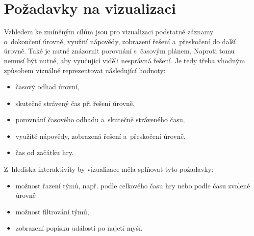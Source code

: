 \documentclass[
  digital, %
  oneside, %
  table,   %
  nolof,     %
  nolot,     %
]{fithesis3}
\begin{document}
\section{Požadavky na vizualizaci}
Vzhledem ke zmíněným cílům jsou pro vizualizaci podstatné záznamy o~dokončení úrovně, využití nápovědy, zobrazení řešení a~přeskočení do další úrovně. Také je nutné znázornit porovnání s~časovým plánem. Naproti tomu nemusí být nutné, aby vyučující viděli nesprávná řešení. Je tedy třeba vhodným způsobem vizuálně reprezentovat následující hodnoty:
\begin{itemize}
  \item časový odhad úrovní,
  \item skutečně strávený čas při řešení úrovně,
  \item porovnání časového odhadu a~skutečně stráveného času,
  \item využité nápovědy, zobrazená řešení a~přeskočení úrovně,
  \item čas od začátku hry.
\end{itemize}
Z~hlediska interaktivity by vizualizace měla splňovat tyto požadavky:
\begin{itemize}
  \item možnost řazení týmů, např. podle celkového času hry nebo podle času zvolené úrovně
  \item možnost filtrování týmů,
  \item zobrazení popisku události po najetí myší.
\end{itemize}
\end{document}
